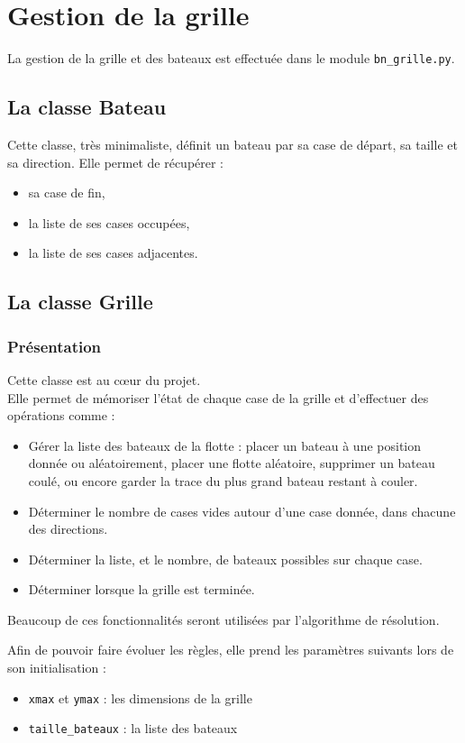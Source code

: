 \chapter{Gestion de la grille}\label{chap_grille}

La gestion de la grille et des bateaux est effectuée dans le module \texttt{bn\_grille.py}.

\section{La classe Bateau}
Cette classe, très minimaliste, définit un bateau par sa case de départ, sa taille et sa direction. Elle permet de récupérer :
\begin{itemize}
\item sa case de fin,
\item la liste de ses cases occupées,
\item la liste de ses cases adjacentes.
\end{itemize}

\section{La classe Grille}
\subsection{Présentation}
Cette classe est au c\oe ur du projet. \\
Elle permet de mémoriser l'état de chaque case de la grille et d'effectuer des opérations comme :
\begin{itemize}
\item Gérer la liste des bateaux de la flotte : placer un bateau à une position donnée ou aléatoirement, placer une flotte aléatoire, supprimer un bateau coulé, ou encore garder la trace du plus grand bateau restant à couler.
\item Déterminer le nombre de cases vides autour d'une case donnée, dans chacune des directions.
\item Déterminer la liste, et le nombre, de bateaux possibles sur chaque case.
\item Déterminer lorsque la grille est terminée.
\end{itemize}
Beaucoup de ces fonctionnalités seront utilisées par l'algorithme de résolution.

Afin de pouvoir faire évoluer les règles, elle prend les paramètres suivants lors de son initialisation :
\begin{itemize}
\item \texttt{xmax} et \texttt{ymax} : les dimensions de la grille
\item \texttt{taille\_bateaux} : la liste des bateaux
\end{itemize}
\medskip

